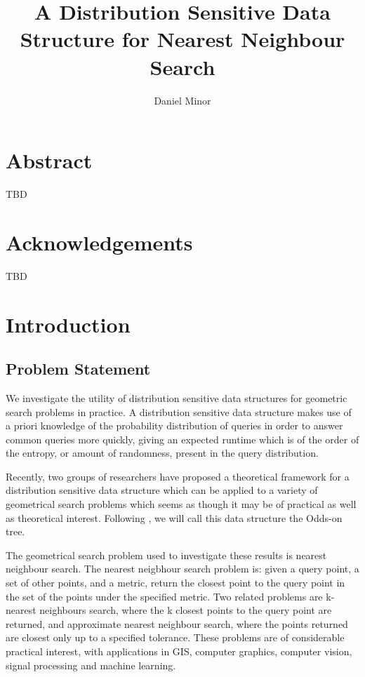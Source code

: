 \documentclass[mcs]{scsthesis}
\title {A Distribution Sensitive Data Structure for Nearest Neighbour Search}
\author {Daniel Minor}
\begin{document}
\beforepreface

\prefacesection

\chapter*{Abstract}

TBD

\chapter*{Acknowledgements}

TBD

\afterpreface

\chapter{Introduction}

\section{Problem Statement}

We investigate the utility of distribution sensitive data structures for
geometric search problems in practice.  A distribution sensitive data structure
makes use of a priori knowledge of the probability distribution of queries in
order to answer common queries more quickly, giving an expected runtime which
is of the order of the entropy, or amount of randomness, present in the query
distribution.

Recently, two groups of researchers \cite{chan} \cite{oddson} have proposed a
theoretical framework for a distribution sensitive data structure which can be
applied to a variety of geometrical search problems which seems as though it
may be of practical as well as theoretical interest.  Following \cite{oddson},
we will call this data structure the Odds-on tree.

The geometrical search problem used to investigate these results is nearest
neighbour search.  The nearest neigbhour search problem is: given a query
point, a set of other points, and a metric, return the closest point to the
query point in the set of the points under the specified metric.  Two related
problems are k-nearest neighbours search, where the k closest points to the
query point are returned, and approximate nearest neighbour search, where the
points returned are closest only up to a specified tolerance.  These problems
are of considerable practical interest, with applications in GIS, computer
graphics, computer vision, signal processing and machine learning.
\end{document}
